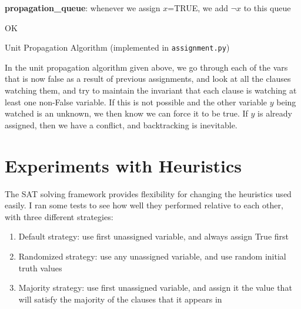 \documentclass[11pt]{article}
\begin{document}
\begin{algorithm}[H]
\SetAlgoLined
{}
\textbf{propagation\_queue}: whenever we assign $x$=TRUE, we add $\neg x$ to this queue

  \Return OK
 \caption{Unit Propagation Algorithm (implemented in \texttt{assignment.py})}
\end{algorithm}

In the unit propagation algorithm given above, we go through each of the vars that is now false as a result of previous assignments, and look at all the clauses watching them, and try to maintain the invariant that each clause is watching at least one non-False variable. If this is not possible and the other variable $y$ being watched is an unknown, we then know we can force it to be true. If $y$ is already assigned, then we have a conflict, and backtracking is inevitable.

\section{Experiments with Heuristics}

The SAT solving framework provides flexibility for changing the heuristics used easily. I ran some tests to see how well they performed relative to each other, with three different strategies:

\begin{enumerate}
  \item Default strategy: use first unassigned variable, and always assign True first
  \item Randomized strategy: use any unassigned variable, and use random initial truth values
  \item Majority strategy: use first unassigned variable, and assign it the value that will satisfy the majority of the clauses that it appears in
\end{enumerate}
\end{document}
